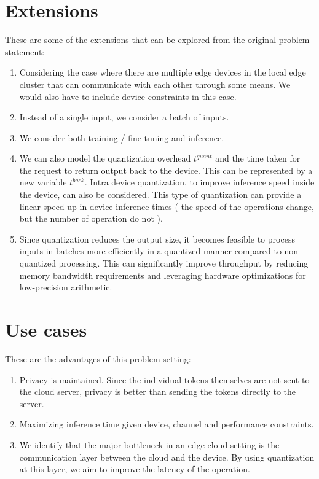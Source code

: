 \documentclass{article}
\begin{document}
\section{Extensions}
These are some of the extensions that can be explored from the original problem statement:
\begin{enumerate}
    \item Considering the case where there are multiple edge devices in the local edge cluster that can communicate with each other through some means. We would also have to include device constraints in this case.  
    \item Instead of a single input, we consider a batch of inputs. 
    \item We consider both training / fine-tuning and inference.
    \item We can also model the quantization overhead $t^{quant}$ and the time taken for the request to return output back to the device. This can be represented by a new variable $t^{back}$. Intra device quantization, to improve inference speed inside the device, can also be considered. This type of quantization can provide a linear speed up in device inference times ( the speed of the operations change, but the number of operation do not ).
    \item Since quantization reduces the output size, it becomes feasible to process inputs in batches more efficiently in a quantized manner compared to non-quantized processing. This can significantly improve throughput by reducing memory bandwidth requirements and leveraging hardware optimizations for low-precision arithmetic.
\end{enumerate}
\section{Use cases}
These are the advantages of this problem setting:
\begin{enumerate}
    \item Privacy is maintained. Since the individual tokens themselves are not sent to the cloud server, privacy is better than sending the tokens directly to the server. 
    \item Maximizing inference time given device, channel and performance constraints. 
    \item We identify that the major bottleneck in an edge cloud setting is the communication layer between the cloud and the device. By using quantization at this layer, we aim to improve the latency of the operation. 
\end{enumerate}
\end{document}
